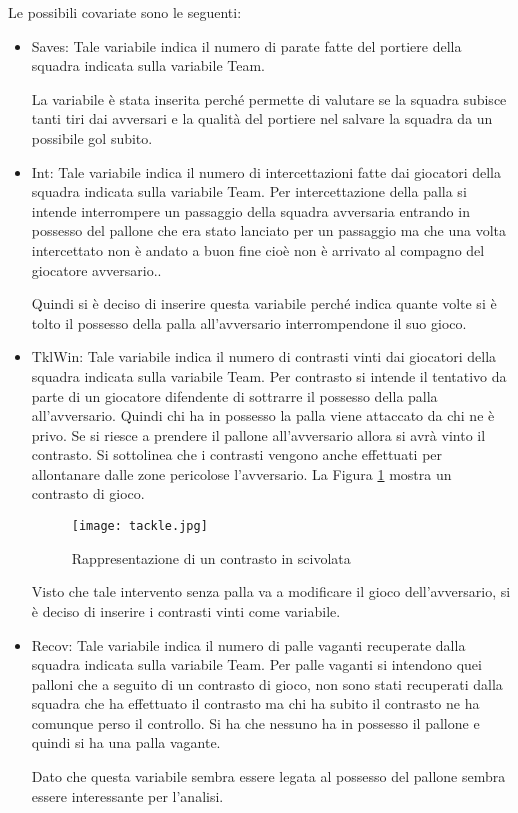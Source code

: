 Le possibili covariate sono le seguenti:
\begin{itemize}
	
	\item \textsf{Saves}: Tale variabile indica il numero di parate fatte del portiere della squadra indicata sulla variabile \textsf{Team}. 
	
	La variabile è stata inserita perché permette di valutare se la squadra subisce tanti tiri dai avversari e la qualità del portiere nel salvare la squadra da un possibile gol subito.
	
	\item \textsf{Int}: Tale variabile indica il numero di intercettazioni fatte dai giocatori della squadra indicata sulla variabile \textsf{Team}. Per intercettazione della palla si intende interrompere un passaggio della squadra avversaria entrando in possesso del pallone che era stato lanciato per un passaggio ma che una volta intercettato non è andato a buon fine cioè non è arrivato al compagno del giocatore avversario.. 
	
	Quindi si è deciso di inserire questa variabile perché indica quante volte si è tolto il possesso della palla all'avversario interrompendone il suo gioco.
	\item \textsf{TklWin}: Tale variabile indica il numero di contrasti vinti dai giocatori della squadra indicata sulla variabile \textsf{Team}. Per contrasto si intende il tentativo da parte di un giocatore difendente di sottrarre il possesso della palla all'avversario. Quindi chi ha in possesso la palla viene attaccato da chi ne è privo. Se si riesce a prendere il pallone all'avversario allora si avrà vinto il contrasto. Si sottolinea che i contrasti vengono anche effettuati per allontanare dalle zone pericolose l'avversario. La Figura \ref{fig:tackle} mostra un contrasto di gioco.
	
	\begin{figure}[!ht]
		\begin{center}
			\texttt{[image: tackle.jpg]}
			\caption{Rappresentazione di un contrasto in scivolata}
		 \label{fig:tackle}
		\end{center}
	\end{figure}
	
	Visto che tale intervento senza palla va a modificare il gioco dell'avversario, si è deciso di inserire i contrasti vinti come variabile. 
	
	\item \textsf{Recov}: Tale variabile indica il numero di palle vaganti recuperate dalla squadra indicata sulla variabile \textsf{Team}. Per palle vaganti si intendono quei palloni che a seguito di un contrasto di gioco, non sono stati recuperati dalla squadra che ha effettuato il contrasto ma chi ha subito il contrasto ne ha comunque perso il controllo. Si ha che nessuno ha in possesso il pallone e quindi si ha una palla vagante.
	
	Dato che questa variabile sembra essere legata al possesso del pallone sembra essere interessante per l'analisi.
	
\end{itemize}

